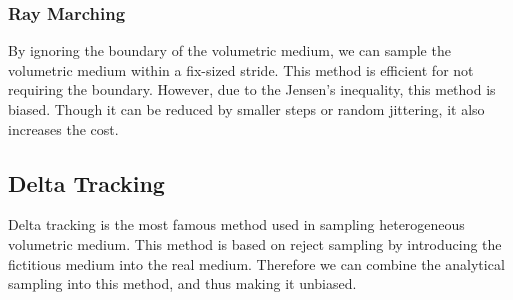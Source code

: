 \documentclass[acmtog]{acmart}
\begin{document}
\subsubsection{Ray Marching}
By ignoring the boundary of the volumetric medium, we can sample the volumetric medium within a fix-sized stride. 
This method is efficient for not requiring the boundary.
However, due to the Jensen's inequality, this method is biased.
Though it can be reduced by smaller steps or random jittering, it also increases the cost.

\subsection{Delta Tracking}
Delta tracking is the most famous method used in sampling heterogeneous volumetric medium.
This method is based on reject sampling by introducing the fictitious medium into the real medium.
Therefore we can combine the analytical sampling into this method, and thus making it unbiased.
\end{document}

